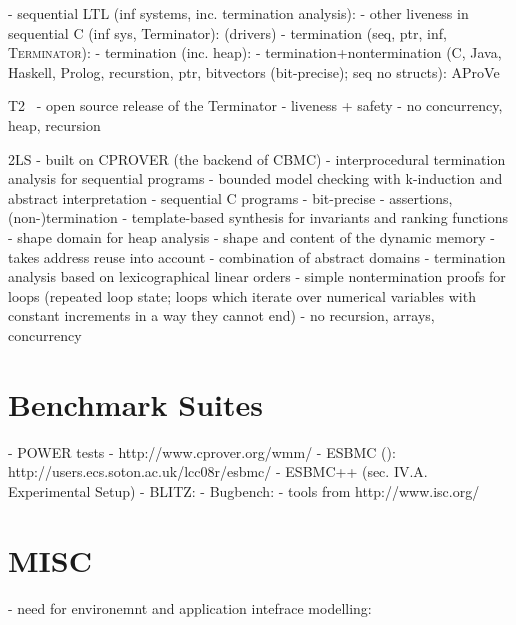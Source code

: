 - sequential LTL (inf systems, inc. termination analysis): \cite{Dietsch2015}
- other liveness in sequential C (inf sys, Terminator): \cite{Cook2007} (drivers)
- termination (seq, ptr, inf, \textsc{Terminator}): \cite{Cook2006}
- termination (inc. heap): \cite{Berdine2006}
- termination+nontermination (C, Java, Haskell, Prolog, recurstion, ptr, bitvectors (bit-precise); seq no structs): AProVe \cite{Hensel2017, Giesl2017}

T2~\cite{Brockschmidt2016}
- open source release of the Terminator
- liveness + safety
- no concurrency, heap, recursion

2LS 
- built on CPROVER (the backend of CBMC)
- interprocedural termination analysis for sequential programs
- bounded model checking with k-induction and abstract interpretation
- sequential C programs
- bit-precise
- assertions, (non-)termination
- template-based synthesis for invariants and ranking functions
- shape domain for heap analysis
  - shape and content of the dynamic memory
  - takes address reuse into account
  - combination of abstract domains
- termination analysis based on lexicographical linear orders
- simple nontermination proofs for loops (repeated loop state; loops which iterate over numerical variables with constant increments in a way they cannot end)
- no recursion, arrays, concurrency

\section{Benchmark Suites}

-  POWER tests
- http://www.cprover.org/wmm/
- ESBMC (): http://users.ecs.soton.ac.uk/lcc08r/esbmc/
- ESBMC++  (sec. IV.A. Experimental Setup)
- BLITZ:
  - Bugbench: %
  - tools from http://www.isc.org/

\section{MISC}

- need for environemnt and application intefrace modelling: 
\fi

